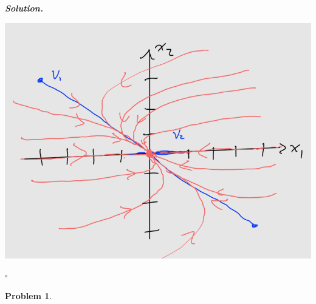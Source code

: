 \documentclass[12pt]{report}
\newtheorem{problem}{Problem}
\newenvironment{solution}[1][\it{Solution}]{\textbf{#1. } }{$\square$}
\begin{document}
\begin{solution}
\begin{enumerate}
            \begin{center}
       \includegraphics[width=.6\linewidth]{images/2.PNG}
    \end{center}

    \end{enumerate}
\end{solution}
\newpage



\begin{problem}
    
\end{problem}
\end{document}
